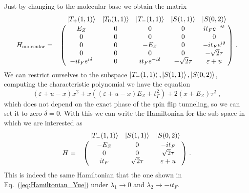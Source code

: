 \documentclass[a4paper,11pt]{article}
\begin{document}
Just by changing to the molecular base we obtain the matrix
\begin{equation}
H_{\text{molecular}}=\bordermatrix{~ & \ket{T_+(1,1)} & \ket{T_0(1,1)} & \ket{T_-(1,1)} & \ket{S(1,1)} & \ket{S(0,2)}\cr
	~ & E_Z   			 & 0     & 0      			  & 0    		   & it_Fe^{-i\delta}	 \cr
	~ & 0     			 & 0     & 0      			  & 0    		   & 0 		  	 		 \cr
	~ & 0     			 & 0     & -E_Z   			  & 0    		   & -it_Fe^{i\delta}    \cr
	~ & 0     			 & 0     & 0      			  & 0    		   & -\sqrt{2}\tau 		 \cr
	~ & -it_Fe^{i\delta} & 0     & it_Fe^{-i\delta}   & -\sqrt{2}\tau  & \varepsilon+u}\; .
\end{equation} We can restrict ourselves to the subspace $\ket{T_-(1,1)}, \ket{S(1,1)}, \ket{S(0,2)}$, computing the characteristic polynomial we have the equation
\begin{equation}
	(\varepsilon+u-x)x^2+x((\varepsilon+u-x)E_Z+t_F^2)+2(x+E_Z)\tau^2\; ,
\end{equation}
which does not depend on the exact phase of the spin flip tunneling, so we can set it to zero $\delta=0$. With this we can write the Hamiltonian for the sub-space in which we are interested as
\begin{equation}
H=\bordermatrix{~ & \ket{T_-(1,1)} & \ket{S(1,1)} & \ket{S(0,2)}\cr
	~ & -E_Z & 0 & -it_F \cr
	~ & 0 & 0 & \sqrt{2}\tau \cr
	~ & it_F & \sqrt{2}\tau & \varepsilon+u \cr}\; .
\end{equation}
This is indeed the same Hamiltonian that the one shown in Eq.~(\ref{eq:Hamiltonian_Yue}) under $\lambda_1\rightarrow 0$ and $\lambda_2\rightarrow -it_F$.

\newpage


\end{document}
